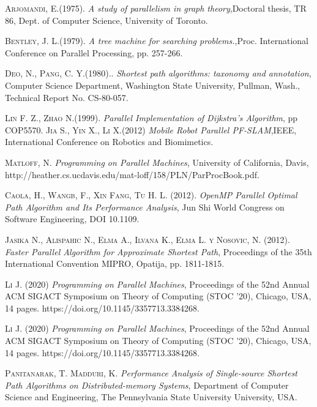\documentclass[11pt]{article}
\begin{document}
\begin{thebibliography}{x}
  \textsc{Arjomandi, E.(1975).}
 \textit{A study of parallelism in graph theory},Doctoral thesis, TR 86, Dept. of Computer Science, University of Toronto.
 
  \textsc{Bentley, J. L.(1979).}
 	\textit{A tree machine for searching problems.},Proc. International Conference on Parallel Processing, pp. 257-266. 	
 
   \textsc{Deo, N., Pang, C. Y.(1980).}. \textit{Shortest path algorithms: taxonomy and annotation}, Computer Science Department, Washington State University, Pullman, Wash., Technical Report No. CS-80-057.
 	
 	  \textsc{Lin F. Z., Zhao N.(1999).} 
 	\textit{Parallel Implementation of Dijkstra's Algorithm}, pp COP5570.	   
  \textsc{Jia S., Yin X., Li X.(2012)}
 \textit{Mobile Robot Parallel PF-SLAM},IEEE, International Conference on Robotics and Biomimetics.  

  \textsc{Matloff, N.} 
 	\textit{Programming on Parallel Machines}, University of California, Davis, http://heather.cs.ucdavis.edu/mat-loff/158/PLN/ParProcBook.pdf.
 
  \textsc{Caola, H., Wangb, F., Xin Fang, Tu H. L. (2012).} 
 	\textit{OpenMP Parallel Optimal Path Algorithm and Its Performance Analysis}, Jun Shi World Congress on Software Engineering, DOI 10.1109.
 	
  \textsc{Jasika N., Alispahic N., Elma A., Ilvana K., Elma L. y Nosovic, N. (2012).} 
 	\textit{Faster Parallel Algorithm for Approximate Shortest Path}, Proceedings of the 35th International Convention MIPRO, Opatija, pp. 1811-1815.
 	
  \textsc{Li J. (2020)} 
 	\textit{Programming on Parallel Machines}, Proceedings of the 52nd Annual ACM SIGACT Symposium on Theory of Computing (STOC ’20), Chicago,  USA, 14 pages. https://doi.org/10.1145/3357713.3384268.


  \textsc{Li J. (2020)} 
 	\textit{Programming on Parallel Machines}, Proceedings of the 52nd Annual ACM SIGACT Symposium on Theory of Computing (STOC ’20), Chicago,  USA, 14 pages. https://doi.org/10.1145/3357713.3384268.

  \textsc{Panitanarak, T. Madduri, K.} 
 	\textit{Performance Analysis of Single-source Shortest Path Algorithms on Distributed-memory Systems}, Department of Computer Science and Engineering, The Pennsylvania State University
University, USA.


\end{thebibliography}
\end{document}
